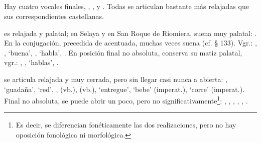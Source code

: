 \subsection{} Hay cuatro vocales finales, \textipa{[-\H{5}]},
\textipa{[-\'{5}]}, \textipa{[-u]} y \uc. Todas se articulan bastante más
relajadas que sus correspondientes castellanas.

\textipa{[-\rfeRelaxedPalatal]} es relajada y palatal; en Selaya y en San
Roque de Riomiera, suena muy palatal: \textipa{[-\rfeVeryPalatal]}. En la conjugación, precedida
de \textipa{[i]} acentuada, muchas veces suena \textipa{[-@]} (cf. § 133).
Vgr.: ,
,
 `buena',
,
 `habla',
. En posición
final no absoluta, conserva su matiz palatal, vgr.:
,
,
 `hablas',
.

\textipa{[-\rfeRelaxedClosed]} se articula relajada y muy cerrada, pero sin
llegar casi nunca a \textipa{[i]} abierta:
,
 `guadaña',
 `red',
,
 (vb.),
 (vb.),
 `entregue',
 `bebe' (imperat.),
 `corre'
(imperat.). Final no absoluta, se puede abrir un poco, pero no
significativamente\footnote{Es decir, se diferencian fonéticamente las dos
realizaciones, pero no hay oposición fonológica ni morfológica.}:
,
,
,
,
,
.

